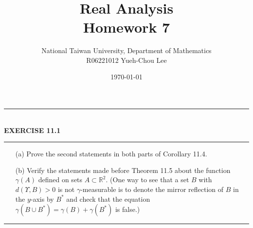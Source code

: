 \documentclass[a4paper,11pt]{article}
\title{Real Analysis\\ Homework 7}
\author{National Taiwan University, Department of Mathematics\\
R06221012 \hspace{0.2cm} Yueh-Chou Lee}
\date{\today}
\begin{document}
\maketitle

	\begin{flushleft}
		\rule[-0.5ex]{17cm}{2pt}\\
			\textbf{EXERCISE 11.1}\\
		\rule[1.5ex]{17cm}{0.5pt}
		\begin{enumerate}
			\item[(a)] Prove the second statements in both parts of Corollary 11.4.\

			\item[(b)] Verify the statements made before Theorem 11.5 about the function $\gamma (A)$ defined on sets $A \subset \mathbb{R}^2$. (One way to see that a set $B$ with $d(\Upsilon,B) > 0$ is not $\gamma$-measurable is to denote the mirror reflection of $B$ in the $y$-axis by $B^*$ and check that the equation $\gamma(B \cup B^*) = \gamma(B) + \gamma(B^*)$ is false.)
		\end{enumerate}
		\rule[1.0ex]{17cm}{0.5pt}\
	\end{flushleft}
\end{document}
